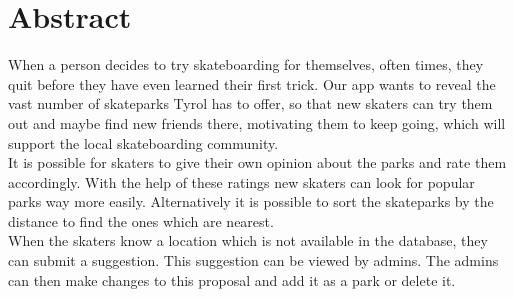 \section*{Abstract}

When a person decides to try skateboarding for themselves, often times, they quit before they have
even learned their first trick. Our app wants to reveal the vast number of skateparks Tyrol has to
offer, so that new skaters can try them out and maybe find new friends there, motivating them to
keep going, which will support the local skateboarding community. \\

It is possible for skaters to give their own opinion about the parks and rate them accordingly.
With the help of these ratings new skaters can look for popular parks way more easily.
Alternatively it is possible to sort the skateparks by the distance to find the ones which are
nearest. \\

When the skaters know a location which is not available in the database, they can submit a
suggestion. This suggestion can be viewed by admins. The admins can then make changes to this
proposal and add it as a park or delete it.\\